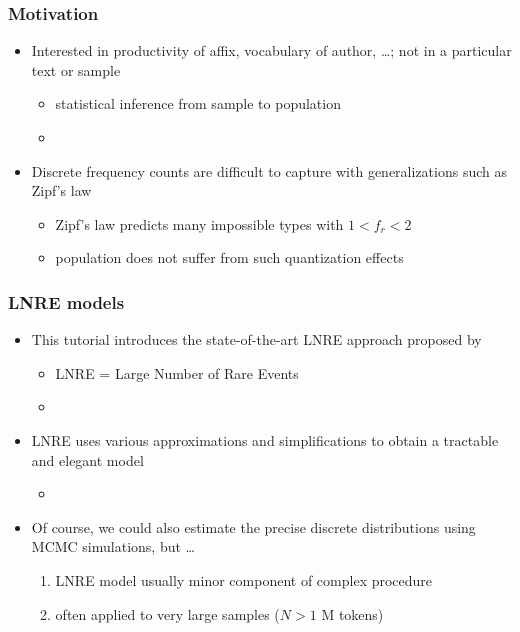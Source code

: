 \documentclass[handout,notes=show,t]{beamer} %
\begin{document}
\begin{frame}
  \frametitle{Motivation}

  \begin{itemize}
  \item Interested in productivity of affix, vocabulary of author, \ldots; not in a particular text or sample\\
    \begin{itemize}
    \item[\hand] statistical inference from sample to population
    \item[]
    \end{itemize}
  \item Discrete frequency counts are difficult to capture with generalizations such as Zipf's law
    \begin{itemize}
    \item Zipf's law predicts many impossible types with $1 < f_r < 2$
    \item[\hand] population does not suffer from such quantization effects
    \end{itemize}
  \end{itemize}
\end{frame}

\begin{frame}
  \frametitle{LNRE models}

  \begin{itemize}
  \item This tutorial introduces the state-of-the-art LNRE approach proposed by \citet{Baayen:01}
    \begin{itemize}
    \item LNRE = Large Number of Rare Events
    \item[]
    \end{itemize}
  \item LNRE uses various approximations and simplifications to obtain a tractable and elegant model
    \begin{itemize}
    \item[]
    \end{itemize}
  \item Of course, we could also estimate the precise discrete distributions using MCMC simulations, but \ldots
    \begin{enumerate}
    \item LNRE model usually minor component of complex procedure
    \item often applied to very large samples ($N > 1$ M tokens)
    \end{enumerate}
  \end{itemize}
\end{frame}
\end{document}
